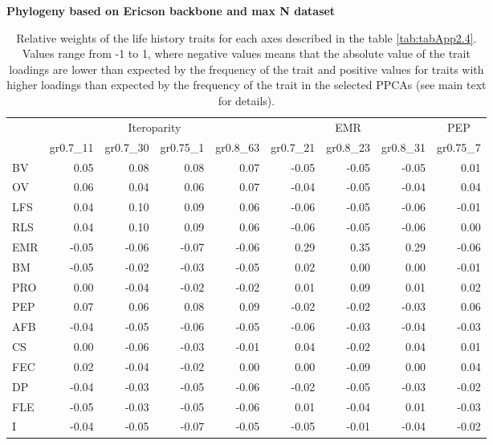 \clearpage%
\begin{landscape}%
\begin{table}
\center
\caption[LHT relative importance of the alternative axes]{
Relative weights of the life history traits for each axes described in the
table \ref{tab:tabApp2.4}. Values range from -1 to 1, where negative values
means that the absolute value of the trait loadings are lower than expected by
the frequency of the trait and positive values for traits with higher loadings
than expected by the frequency of the trait in the selected PPCAs (see main
text for details).
}
\label{tab:tabApp2.6}
\begin{footnotesize}

\textbf{Phylogeny based on Ericson backbone and max N dataset}

\begin{tabular}{@{}l|rrrr|rrr|r@{}}
\toprule
 & \multicolumn{4}{c|}{Iteroparity} & \multicolumn{3}{c|}{EMR} & \multicolumn{1}{c}{PEP}\\
 & gr0.7\_11 & gr0.7\_30 & gr0.75\_1 & gr0.8\_63 & gr0.7\_21 & gr0.8\_23 & gr0.8\_31 & gr0.75\_7\\
\midrule
BV & 0.05 & 0.08 & 0.08 & 0.07 & -0.05 & -0.05 & -0.05 & 0.01\\
OV & 0.06 & 0.04 & 0.06 & 0.07 & -0.04 & -0.05 & -0.04 & 0.04\\
LFS & 0.04 & 0.10 & 0.09 & 0.06 & -0.06 & -0.05 & -0.06 & -0.01\\
RLS & 0.04 & 0.10 & 0.09 & 0.06 & -0.06 & -0.05 & -0.06 & 0.00\\
EMR & -0.05 & -0.06 & -0.07 & -0.06 & 0.29 & 0.35 & 0.29 & -0.06\\
BM & -0.05 & -0.02 & -0.03 & -0.05 & 0.02 & 0.00 & 0.00 & -0.01\\
PRO & 0.00 & -0.04 & -0.02 & -0.02 & 0.01 & 0.09 & 0.01 & 0.02\\
PEP & 0.07 & 0.06 & 0.08 & 0.09 & -0.02 & -0.02 & -0.03 & 0.06\\
AFB & -0.04 & -0.05 & -0.06 & -0.05 & -0.06 & -0.03 & -0.04 & -0.03\\
CS & 0.00 & -0.06 & -0.03 & -0.01 & 0.04 & -0.02 & 0.04 & 0.01\\
FEC & 0.02 & -0.04 & -0.02 & 0.00 & 0.00 & -0.09 & 0.00 & 0.04\\
DP & -0.04 & -0.03 & -0.05 & -0.06 & -0.02 & -0.05 & -0.03 & -0.02\\
FLE & -0.05 & -0.03 & -0.05 & -0.06 & 0.01 & -0.04 & 0.01 & -0.03\\
I & -0.04 & -0.05 & -0.07 & -0.05 & -0.05 & -0.01 & -0.04 & -0.02\\
\bottomrule
\end{tabular}


\end{footnotesize}
\end{table}
\end{landscape}
